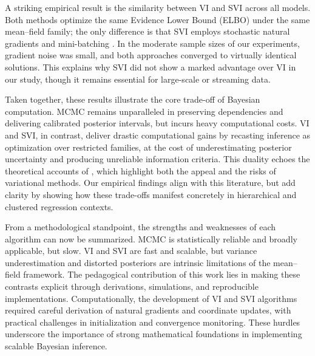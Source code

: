 \vspace{0.3cm}

A striking empirical result is the similarity between VI and SVI across all models. Both methods optimize the same Evidence Lower Bound (ELBO) under the same mean–field family; the only difference is that SVI employs stochastic natural gradients and mini-batching \cite{HOFFMAN, VAE}. In the moderate sample sizes of our experiments, gradient noise was small, and both approaches converged to virtually identical solutions. This explains why SVI did not show a marked advantage over VI in our study, though it remains essential for large-scale or streaming data.

\vspace{0.3cm}

Taken together, these results illustrate the core trade-off of Bayesian computation. MCMC remains unparalleled in preserving dependencies and delivering calibrated posterior intervals, but incurs heavy computational costs. VI and SVI, in contrast, deliver drastic computational gains by recasting inference as optimization over restricted families, at the cost of underestimating posterior uncertainty and producing unreliable information criteria. This duality echoes the theoretical accounts of \cite{Wainwright2007-ul, Blei2016VariationalIA, zhang2018advancesvariationalinference}, which highlight both the appeal and the risks of variational methods. Our empirical findings align with this literature, but add clarity by showing how these trade-offs manifest concretely in hierarchical and clustered regression contexts.

\vspace{0.3cm}

From a methodological standpoint, the strengths and weaknesses of each algorithm can now be summarized. MCMC is statistically reliable and broadly applicable, but slow. VI and SVI are fast and scalable, but variance underestimation and distorted posteriors are intrinsic limitations of the mean–field framework. The pedagogical contribution of this work lies in making these contrasts explicit through derivations, simulations, and reproducible implementations. Computationally, the development of VI and SVI algorithms required careful derivation of natural gradients and coordinate updates, with practical challenges in initialization and convergence monitoring. These hurdles underscore the importance of strong mathematical foundations in implementing scalable Bayesian inference.

\vspace{0.3cm}

